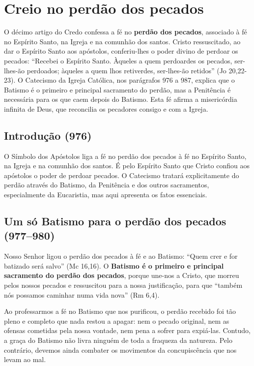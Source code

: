 \chapter{Creio no perdão dos pecados}

O décimo artigo do Credo confessa a fé no \textbf{perdão dos pecados}, associado à fé no Espírito Santo, na Igreja e na comunhão dos santos. Cristo ressuscitado, ao dar o Espírito Santo aos apóstolos, conferiu-lhes o poder divino de perdoar os pecados: ``Recebei o Espírito Santo. Àqueles a quem perdoardes os pecados, ser-lhes-ão perdoados; àqueles a quem lhos retiverdes, ser-lhes-ão retidos'' (Jo 20,22-23). O Catecismo da Igreja Católica, nos parágrafos 976 a 987, explica que o Batismo é o primeiro e principal sacramento do perdão, mas a Penitência é necessária para os que caem depois do Batismo. Esta fé afirma a misericórdia infinita de Deus, que reconcilia os pecadores consigo e com a Igreja.

\section{Introdução (976)}

O Símbolo dos Apóstolos liga a fé no perdão dos pecados à fé no Espírito Santo, na Igreja e na comunhão dos santos. É pelo Espírito Santo que Cristo confiou aos apóstolos o poder de perdoar pecados. O Catecismo tratará explicitamente do perdão através do Batismo, da Penitência e dos outros sacramentos, especialmente da Eucaristia, mas aqui apresenta os fatos essenciais.

\section{Um só Batismo para o perdão dos pecados (977--980)}

Nosso Senhor ligou o perdão dos pecados à fé e ao Batismo: ``Quem crer e for batizado será salvo'' (Mc 16,16). O \textbf{Batismo é o primeiro e principal sacramento do perdão dos pecados}, porque une-nos a Cristo, que morreu pelos nossos pecados e ressuscitou para a nossa justificação, para que ``também nós possamos caminhar numa vida nova'' (Rm 6,4).

Ao professarmos a fé no Batismo que nos purificou, o perdão recebido foi tão pleno e completo que nada restou a apagar: nem o pecado original, nem as ofensas cometidas pela nossa vontade, nem pena a sofrer para expiá-las. Contudo, a graça do Batismo não livra ninguém de toda a fraqueza da natureza. Pelo contrário, devemos ainda combater os movimentos da concupiscência que nos levam ao mal.

